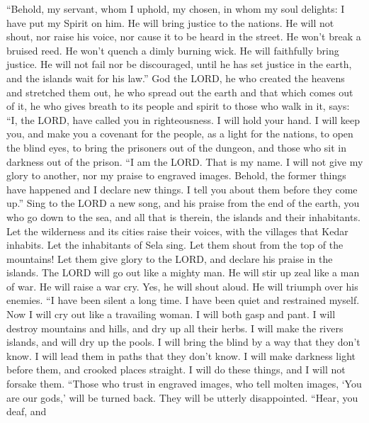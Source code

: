  ``Behold, my servant, whom I uphold, my chosen, in whom
my soul delights: I have put my Spirit on him. He will bring justice to
the nations.  He will not shout, nor raise his voice, nor
cause it to be heard in the street.  He won't break a
bruised reed. He won't quench a dimly burning wick. He will faithfully
bring justice.  He will not fail nor be discouraged, until
he has set justice in the earth, and the islands wait for his law.''
 God the LORD, he who created the heavens and stretched
them out, he who spread out the earth and that which comes out of it, he
who gives breath to its people and spirit to those who walk in it, says:
 ``I, the LORD, have called you in righteousness. I will
hold your hand. I will keep you, and make you a covenant for the people,
as a light for the nations,  to open the blind eyes, to
bring the prisoners out of the dungeon, and those who sit in darkness
out of the prison.  ``I am the LORD. That is my name. I
will not give my glory to another, nor my praise to engraved images.
 Behold, the former things have happened and I declare new
things. I tell you about them before they come up.'' 
Sing to the LORD a new song, and his praise from the end of the earth,
you who go down to the sea, and all that is therein, the islands and
their inhabitants.  Let the wilderness and its cities
raise their voices, with the villages that Kedar inhabits. Let the
inhabitants of Sela sing. Let them shout from the top of the mountains!
 Let them give glory to the LORD, and declare his praise
in the islands.  The LORD will go out like a mighty man.
He will stir up zeal like a man of war. He will raise a war cry. Yes, he
will shout aloud. He will triumph over his enemies.  ``I
have been silent a long time. I have been quiet and restrained myself.
Now I will cry out like a travailing woman. I will both gasp and pant.
 I will destroy mountains and hills, and dry up all their
herbs. I will make the rivers islands, and will dry up the pools.
 I will bring the blind by a way that they don't know. I
will lead them in paths that they don't know. I will make darkness light
before them, and crooked places straight. I will do these things, and I
will not forsake them.  ``Those who trust in engraved
images, who tell molten images, `You are our gods,' will be turned back.
They will be utterly disappointed.  ``Hear, you deaf, and
